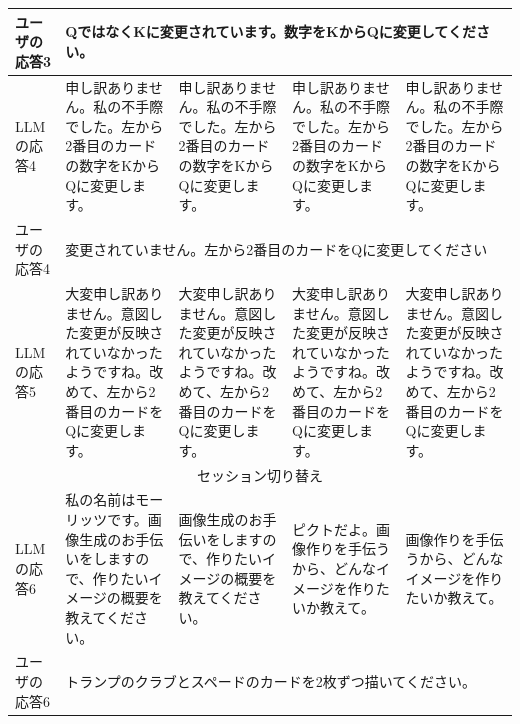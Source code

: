 \documentclass[10pt,twocolumn]{jsarticle}
\begin{document}
\begin{table}[htbp]
\begin{tabularx}{\textwidth}{lXXXX}
        ユーザの応答3 & \multicolumn{4}{l}{QではなくKに変更されています。数字をKからQに変更してください。} \\
        \hline
        
        LLMの応答4 & 
        申し訳ありません。私の不手際でした。左から2番目のカードの数字をKからQに変更します。
        & 
        申し訳ありません。私の不手際でした。左から2番目のカードの数字をKからQに変更します。
        & 
        申し訳ありません。私の不手際でした。左から2番目のカードの数字をKからQに変更します。
        & 
        申し訳ありません。私の不手際でした。左から2番目のカードの数字をKからQに変更します。
         \\
        \hline
        
        ユーザの応答4 & \multicolumn{4}{l}{変更されていません。左から2番目のカードをQに変更してください
        } \\
        \hline
        
        LLMの応答5 & 
        大変申し訳ありません。意図した変更が反映されていなかったようですね。改めて、左から2番目のカードをQに変更します。
        & 
        大変申し訳ありません。意図した変更が反映されていなかったようですね。改めて、左から2番目のカードをQに変更します。
        & 
        大変申し訳ありません。意図した変更が反映されていなかったようですね。改めて、左から2番目のカードをQに変更します。
        & 
        大変申し訳ありません。意図した変更が反映されていなかったようですね。改めて、左から2番目のカードをQに変更します。
         \\
        \hline
        
        
        \multicolumn{5}{c}{セッション切り替え} \\
        \hline
        
        LLMの応答6 & 
        私の名前はモーリッツです。画像生成のお手伝いをしますので、作りたいイメージの概要を教えてください。
        & 
        画像生成のお手伝いをしますので、作りたいイメージの概要を教えてください。
         & 
        ピクトだよ。画像作りを手伝うから、どんなイメージを作りたいか教えて。
         & 
        画像作りを手伝うから、どんなイメージを作りたいか教えて。
         \\
        \hline
        
        ユーザの応答6 & \multicolumn{4}{l}{トランプのクラブとスペードのカードを2枚ずつ描いてください。} \\
        \hline
        

\end{tabularx}
\end{table}
\end{document}
